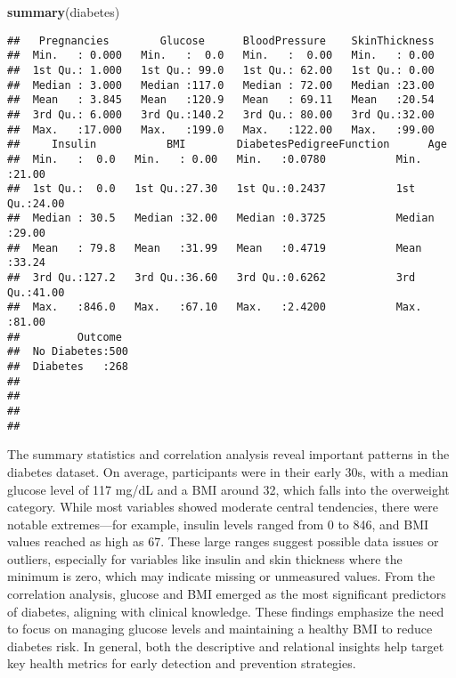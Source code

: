 \documentclass[
]{article}
\newenvironment{Shaded}{\begin{snugshade}}{\end{snugshade}}
\newcommand{\FunctionTok}[1]{\textcolor[rgb]{0.13,0.29,0.53}{\textbf{#1}}}
\newcommand{\NormalTok}[1]{#1}
\begin{document}
\begin{Shaded}
\begin{Highlighting}[]
\FunctionTok{summary}\NormalTok{(diabetes)}
\end{Highlighting}
\end{Shaded}

\begin{verbatim}
##   Pregnancies        Glucose      BloodPressure    SkinThickness  
##  Min.   : 0.000   Min.   :  0.0   Min.   :  0.00   Min.   : 0.00  
##  1st Qu.: 1.000   1st Qu.: 99.0   1st Qu.: 62.00   1st Qu.: 0.00  
##  Median : 3.000   Median :117.0   Median : 72.00   Median :23.00  
##  Mean   : 3.845   Mean   :120.9   Mean   : 69.11   Mean   :20.54  
##  3rd Qu.: 6.000   3rd Qu.:140.2   3rd Qu.: 80.00   3rd Qu.:32.00  
##  Max.   :17.000   Max.   :199.0   Max.   :122.00   Max.   :99.00  
##     Insulin           BMI        DiabetesPedigreeFunction      Age       
##  Min.   :  0.0   Min.   : 0.00   Min.   :0.0780           Min.   :21.00  
##  1st Qu.:  0.0   1st Qu.:27.30   1st Qu.:0.2437           1st Qu.:24.00  
##  Median : 30.5   Median :32.00   Median :0.3725           Median :29.00  
##  Mean   : 79.8   Mean   :31.99   Mean   :0.4719           Mean   :33.24  
##  3rd Qu.:127.2   3rd Qu.:36.60   3rd Qu.:0.6262           3rd Qu.:41.00  
##  Max.   :846.0   Max.   :67.10   Max.   :2.4200           Max.   :81.00  
##         Outcome   
##  No Diabetes:500  
##  Diabetes   :268  
##                   
##                   
##                   
## 
\end{verbatim}

The summary statistics and correlation analysis reveal important
patterns in the diabetes dataset. On average, participants were in their
early 30s, with a median glucose level of 117 mg/dL and a BMI around 32,
which falls into the overweight category. While most variables showed
moderate central tendencies, there were notable extremes---for example,
insulin levels ranged from 0 to 846, and BMI values reached as high as
67. These large ranges suggest possible data issues or outliers,
especially for variables like insulin and skin thickness where the
minimum is zero, which may indicate missing or unmeasured values. From
the correlation analysis, glucose and BMI emerged as the most
significant predictors of diabetes, aligning with clinical knowledge.
These findings emphasize the need to focus on managing glucose levels
and maintaining a healthy BMI to reduce diabetes risk. In general, both
the descriptive and relational insights help target key health metrics
for early detection and prevention strategies.
\end{document}

